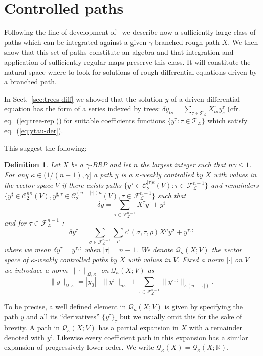 \documentclass[a4paper,11pt,reqno]{article}
\newcommand{\1}{{\bf 1}}
\newcommand{\der}{\delta}
\newcommand{\RR}{\mathbb{R}}
\newcommand{\FF}{\mathcal{F}}
\newcommand{\QQ}{\mathcal{Q}}
\newcommand{\CC}{\mathcal{C}}
\newcommand{\LL}{\mathcal{L}}
\newcommand{\cl}{\mathcal L}
\newtheorem{definition}[theorem]{Definition}
\newcommand{\TT}{\mathcal{T}}
\begin{document}
\section{Controlled paths}
\label{sec:controlled}
Following the line of development of~\cite{MR2091358} we describe now
a sufficiently large class of paths which can be integrated against a
given $\gamma$-branched rough path $X$. We then show that this set of
paths constitute an algebra and that integration and application of
sufficiently regular maps preserve this class. It will constitute the
natural space where to look for solutions of rough differential
equations driven by a branched path.  

In Sect.~\ref{sec:trees-diff} we showed that the solution  $y$ of a driven differential equation has the form of a series indexed by trees:
$
\der y_{ts} = \sum_{\tau \in \TT_\cl}  X^{\tau}_{ts} y^{\tau}_s
$ (cfr. eq.~(\ref{eq:tree-rep}))
 for suitable coefficients functions $\{ y^\tau : \tau \in \TT_\LL \}$ which satisfy eq.~(\ref{eq:ytau-der}). 

This suggest the following:

\begin{definition}
\label{def:controlled-path}
Let $X$ be a $\gamma$-BRP  and let $n$ the largest integer such that
$n\gamma\le 1$. For any $\kappa \in (1/(n+1),\gamma]$
a path $y$ is a $\kappa$-\emph{weakly controlled} by $X$ with values in the vector space $V$ if there exists paths $\{ y^{\tau} \in \CC^{|\tau|\kappa}_2(V) : \tau \in \FF_\LL^{n-1}\}$ and remainders $\{y^{\sharp} \in \CC_2^{n\kappa}(V), y^{\sharp,\tau} \in \CC_2^{(n-|\tau|)\kappa}(V), \tau \in \FF_{\cl}^{n-1}\}$ such that
\begin{equation}
  \label{eq:control}
\der y = \sum_{\tau \in \FF_\cl^{n-1}}  X^{\tau} y^{\tau} + y^\sharp  
\end{equation}
and for $\tau \in \FF_\cl^{n-1}$ :
\begin{equation}
  \label{eq:control2}
  \der y^{\tau} = \sum_{\sigma \in \FF_\cl^{n-1}}\sum_{\rho} c'(\sigma,\tau,\rho)  X^{\rho} y^{\sigma} + y^{\tau,\sharp}
\end{equation}
where we mean $\der y^{\tau} = y^{\tau,\sharp}$ when $|\tau| = n-1$.
We denote $\QQ_\kappa(X;V)$ the vector space  of $\kappa$-weakly
controlled paths by $X$ with values in $V$. Fixed a norm $|\cdot|$ on $V$   we introduce a norm $\|\cdot\|_{\QQ,\kappa}$ on $\QQ_\kappa(X;V)$ as
$$
\|y\|_{\QQ,\kappa} = |y_0| + \|y^\sharp\|_{n\kappa} + \sum_{\tau\in\FF_\LL^{n-1}} \|y^{\tau,\sharp}\|_{\kappa(n-|\tau|)}.
$$   
\end{definition}
To be precise, a well defined element in $\QQ_\kappa(X;V)$ is given by specifying the
path $y$ and all its ``derivatives'' $\{y^\tau\}_\tau$ but we usually
omit this for the sake of brevity.
A path in $\QQ_\kappa(X;V)$ has a partial
expansion in $X$ with a remainder denoted with $y^\sharp$. Likewise
every coefficient path in this expansion has a similar expansion of
progressively lower order.  We write $\QQ_{\kappa}(X) = \QQ_{\kappa}(X;\RR)$.
\end{document}
